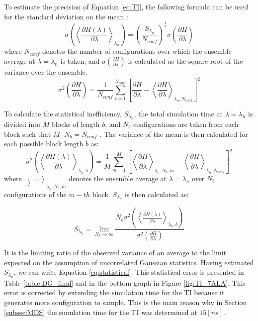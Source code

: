 To estimate the precision of Equation \ref{eq:TI}, the following formula can be used for the standard deviation on the mean \cite{daura1996free}:
\begin{equation}
    \sigma\left ( \left \langle \frac{\partial H(\lambda )}{\partial \lambda } \right \rangle_{\lambda_n} \right ) = \left( \frac{S_{\lambda_n}}{N_{conf}} \right )^\frac{1}{2}\sigma\left (\frac{\partial H}{\partial \lambda}\right )
\end{equation}
where $N_{conf}$ denotes the number of configurations over which the ensemble average at $\lambda=\lambda_n$ is taken, and $\sigma\left (\frac{\partial H}{\partial \lambda}\right )$ is calculated as the square root of the variance over the ensemble.
\begin{equation}
    \sigma^2\left (\frac{\partial H}{\partial \lambda}\right )=\frac{1}{N_{conf}}\sum^{N_{conf}}_{t=1} \left[ \frac{\partial H}{\partial \lambda} - \left\langle\frac{\partial H}{\partial \lambda} \right \rangle_{\lambda_n,N_{conf}}\right ]^2
    \label{eq:statistical}
\end{equation}


To calculate the statistical inefficiency, $S_\lambda_n$, the total simulation time at $\lambda=\lambda_n$ is divided into $M$ blocks of length $b$, and $N_b$ configurations are taken from each block such that $M\cdot N_b=N_{conf}$ \cite{allen2017computer}. The variance of the mean is then calculated for each possible block length $b$ as: 
\begin{equation}
     \sigma^2\left ( \left \langle \frac{\partial H(\lambda )}{\partial \lambda } \right \rangle_{\lambda_n,b} \right ) = \frac{1}{M}\sum^M_{m=1}\left[ \left\langle\frac{\partial H}{\partial \lambda}\right\rangle_{\lambda_n,N_b,m}- \left\langle\frac{\partial H}{\partial \lambda} \right \rangle_{\lambda_n,N_{conf}}\right ]^2
\end{equation}
where $\left\rangle ... \right\rangle_{\lambda_n,N_b,m}$ denotes the ensemble average at $\lambda = \lambda_n$ over $N_b$ configurations of the $m-th$ block. $S_\lambda_n$ is then calculated as: 

\begin{equation}
    S_\lambda_n=\lim_{N_b\rightarrow \infty }\frac{N_b \sigma^2\left ( \left \langle \frac{\partial H(\lambda )}{\partial \lambda } \right \rangle_{\lambda_n,b} \right )}{ \sigma^2\left (\frac{\partial H}{\partial \lambda}\right )}
\end{equation}
\par
It is the limiting ratio of the observed variance of an average to the limit expected on the
assumption of uncorrelated Gaussian statistics. Having estimated $S_\lambda_n$, we can write Equation \ref{eq:statistical}. This statistical error is presented in Table \ref{table:DG_final} and in the bottom graph in Figure \ref{fig:TI_7ALA}. This error is corrected by extending the simulation time for the TI because it generates more configuration to sample. This is the main reason why in Section \ref{subsec:MDS} the simulation time for the TI was determined at $15 [ns]$. 

